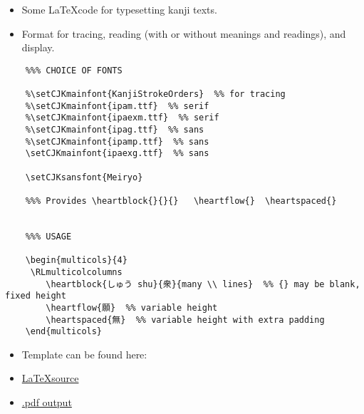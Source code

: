\documentclass[letterpaper]{article}
\begin{document}
	\vspace*{3cm}
	
	

	\vspace*{2cm}
	    
	    \begin{itemize}
	    	\item[]  Some \LaTeX code for typesetting kanji texts.
	    	\item[] Format for tracing, reading (with or without meanings and readings), and display.
	    \end{itemize}
	    
	    
	    
	
	\vspace*{1cm}
	
	
	\begin{verbatim}
	%%% CHOICE OF FONTS
	
	%\setCJKmainfont{KanjiStrokeOrders}  %% for tracing 
	%\setCJKmainfont{ipam.ttf}  %% serif
	%\setCJKmainfont{ipaexm.ttf}  %% serif
	%\setCJKmainfont{ipag.ttf}  %% sans
	%\setCJKmainfont{ipamp.ttf}  %% sans
	\setCJKmainfont{ipaexg.ttf}  %% sans
	
	\setCJKsansfont{Meiryo}
	
	%%% Provides \heartblock{}{}{}   \heartflow{}  \heartspaced{}
	
	
	%%% USAGE
	
	\begin{multicols}{4}
	 \RLmulticolcolumns
	    \heartblock{しゅう shu}{衆}{many \\ lines}  %% {} may be blank, fixed height
	    \heartflow{願}  %% variable height
	    \heartspaced{無}  %% variable height with extra padding
	\end{multicols}
	\end{verbatim}
	
	\vspace*{1cm}
	 
	\begin{itemize}
		\begin{itemize}
			\item[] {\Large Template can be found here:}
			 \item[] \href{https://github.com/gwmatthews/TheFourVows/blob/main/the-four-vows.tex}{\LaTeX source }
			 \item[] \href{https://github.com/gwmatthews/TheFourVows/blob/main/the-four-vows.pdf}{.pdf output}
		\end{itemize}
	\end{itemize}
	
\end{document}
